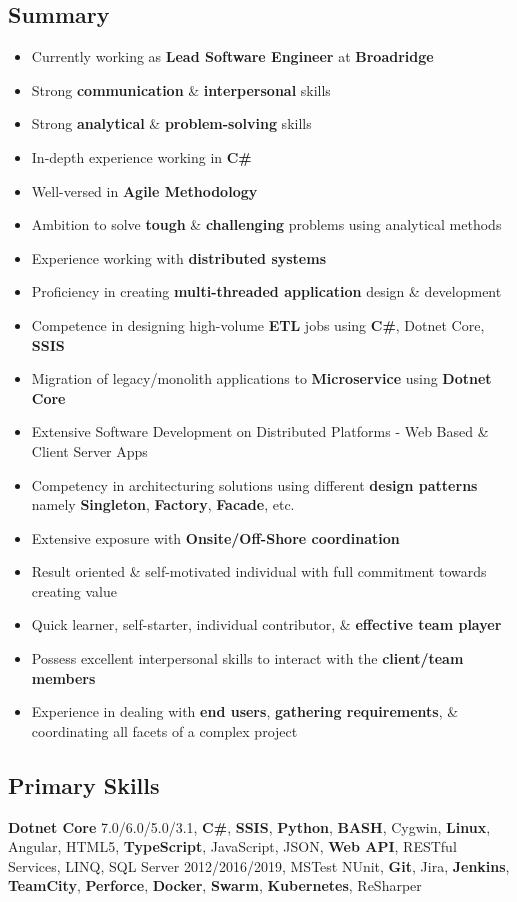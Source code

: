 \documentclass[letterpaper,11pt]{article}
\begin{document}
\subsection{Summary}
\begin{itemize}
    \item Currently working as \textbf{Lead Software Engineer} at \textbf{Broadridge}
    \item Strong \textbf{communication} \& \textbf{interpersonal} skills
    \item Strong \textbf{analytical} \& \textbf{problem-solving} skills
    \item In-depth experience working in \textbf{C\#}
    \item Well-versed in \textbf{Agile Methodology}
    \item Ambition to solve \textbf{tough} \& \textbf{challenging} problems using analytical methods
    \item Experience working with \textbf{distributed systems}
    \item Proficiency in creating \textbf{multi-threaded application} design \& development
    \item Competence in designing high-volume \textbf{ETL} jobs using \textbf{C\#}, Dotnet Core, \textbf{SSIS}
    \item Migration of legacy/monolith applications to \textbf{Microservice} using \textbf{Dotnet Core}
    \item Extensive Software Development on Distributed Platforms - Web Based \& Client Server Apps
    \item Competency in architecturing solutions using different \textbf{design patterns} namely \textbf{Singleton}, \textbf{Factory}, \textbf{Facade}, etc.
    \item Extensive exposure with \textbf{Onsite/Off-Shore coordination}
    \item Result oriented \& self-motivated individual with full commitment towards creating value
    \item Quick learner, self-starter, individual contributor, \& \textbf{effective team player}
    \item Possess excellent interpersonal skills to interact with the \textbf{client/team members}
    \item Experience in dealing with \textbf{end users}, \textbf{gathering requirements}, \& coordinating all facets of a complex project
\end{itemize}
\pagebreak

\subsection{Primary Skills}
\textbf{Dotnet Core} 7.0/6.0/5.0/3.1, \textbf{C\#}, \textbf{SSIS}, \textbf{Python}, \textbf{BASH}, Cygwin, \textbf{Linux}, Angular, HTML5, \textbf{TypeScript}, JavaScript, JSON, \textbf{Web API}, RESTful Services, LINQ, SQL Server 2012/2016/2019, MSTest NUnit, \textbf{Git}, Jira, \textbf{Jenkins}, \textbf{TeamCity}, \textbf{Perforce}, \textbf{Docker}, \textbf{Swarm}, \textbf{Kubernetes}, ReSharper
\end{document}
